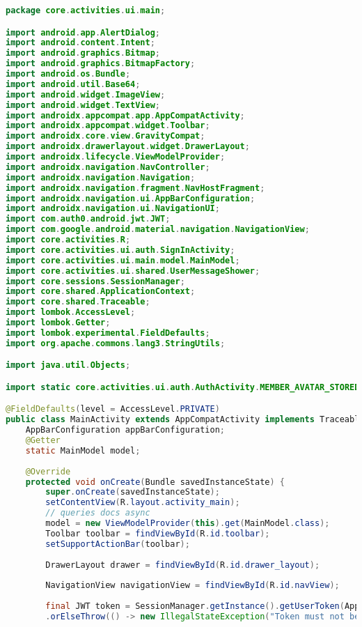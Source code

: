 \begin{lstlisting}[language=Java]
package core.activities.ui.main;

import android.app.AlertDialog;
import android.content.Intent;
import android.graphics.Bitmap;
import android.graphics.BitmapFactory;
import android.os.Bundle;
import android.util.Base64;
import android.widget.ImageView;
import android.widget.TextView;
import androidx.appcompat.app.AppCompatActivity;
import androidx.appcompat.widget.Toolbar;
import androidx.core.view.GravityCompat;
import androidx.drawerlayout.widget.DrawerLayout;
import androidx.lifecycle.ViewModelProvider;
import androidx.navigation.NavController;
import androidx.navigation.Navigation;
import androidx.navigation.fragment.NavHostFragment;
import androidx.navigation.ui.AppBarConfiguration;
import androidx.navigation.ui.NavigationUI;
import com.auth0.android.jwt.JWT;
import com.google.android.material.navigation.NavigationView;
import core.activities.R;
import core.activities.ui.auth.SignInActivity;
import core.activities.ui.main.model.MainModel;
import core.activities.ui.shared.UserMessageShower;
import core.sessions.SessionManager;
import core.shared.ApplicationContext;
import core.shared.Traceable;
import lombok.AccessLevel;
import lombok.Getter;
import lombok.experimental.FieldDefaults;
import org.apache.commons.lang3.StringUtils;

import java.util.Objects;

import static core.activities.ui.auth.AuthActivity.MEMBER_AVATAR_STORED_KEY;

@FieldDefaults(level = AccessLevel.PRIVATE)
public class MainActivity extends AppCompatActivity implements Traceable, UserMessageShower {
	AppBarConfiguration appBarConfiguration;
	@Getter
	static MainModel model;
	
	@Override
	protected void onCreate(Bundle savedInstanceState) {
		super.onCreate(savedInstanceState);
		setContentView(R.layout.activity_main);
		// queries docs async
		model = new ViewModelProvider(this).get(MainModel.class);
		Toolbar toolbar = findViewById(R.id.toolbar);
		setSupportActionBar(toolbar);
		
		DrawerLayout drawer = findViewById(R.id.drawer_layout);
		
		NavigationView navigationView = findViewById(R.id.navView);
		
		final JWT token = SessionManager.getInstance().getUserToken(ApplicationContext.get())
		.orElseThrow(() -> new IllegalStateException("Token must not be null at this stage."));
		

\end{lstlisting}
